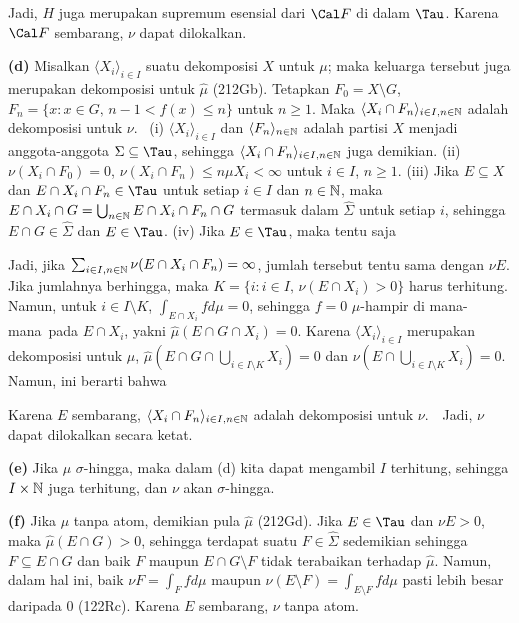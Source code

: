 {\noindent Jadi, $H$ juga merupakan supremum esensial dari $\Cal F$
di dalam $\Tau$. Karena $\Cal F$ sembarang, $\nu$ dapat dilokalkan.

\medskip

{\bf (d)} Misalkan $\langle X_i\rangle_{i\in I}$ suatu dekomposisi
$X$ untuk $\mu$; maka keluarga tersebut juga merupakan dekomposisi untuk
$\hat\mu$ (212Gb). Tetapkan $F_0=X\setminus G$,
$F_n=\{x:x\in G,\,n-1<f(x)\le n\}$ untuk $n\ge 1$. Maka
$\langle X_i\cap F_n\rangle_{i\in I,n\in\Bbb N}$ adalah dekomposisi
untuk $\nu$. \Prf\ (i) $\langle X_i\rangle_{i\in I}$ dan
$\langle F_n\rangle_{n\in\Bbb N}$ adalah partisi $X$ menjadi
anggota-anggota $\Sigma\subseteq\Tau$, sehingga
$\langle X_i\cap F_n\rangle_{i\in I,n\in\Bbb N}$ juga demikian.
(ii) $\nu(X_i\cap F_0)=0$,
$\nu(X_i\cap F_n)\le n\mu X_i<\infty$ untuk $i\in I$, $n\ge 1$.
(iii) Jika $E\subseteq X$ dan $E\cap X_i\cap F_n\in\Tau$ untuk setiap
$i\in I$ dan $n\in\Bbb N$, maka
$E\cap X_i\cap G=\bigcup_{n\in\Bbb N}E\cap X_i\cap F_n\cap G$ termasuk
dalam $\hat\Sigma$ untuk setiap $i$, sehingga
$E\cap G\in\hat\Sigma$ dan $E\in\Tau$.
(iv) Jika $E\in\Tau$, maka tentu saja


\noindent Jadi, jika
$\sum_{i\in I,n\in\Bbb N}\nu(E\cap X_i\cap F_n)=\infty$, jumlah tersebut
tentu sama dengan $\nu E$. Jika jumlahnya berhingga, maka
$K=\{i:i\in I,\,\nu(E\cap X_i)>0\}$ harus terhitung. Namun, untuk
$i\in I\setminus K$, $\int_{E\cap X_i}fd\mu=0$, sehingga
$f=0\,\,\mu$-hampir di mana-mana\ pada $E\cap X_i$, yakni
$\hat\mu(E\cap G\cap X_i)=0$. Karena
$\langle X_i\rangle_{i\in I}$ merupakan dekomposisi untuk $\hat\mu$,
$\hat\mu(E\cap G\cap\bigcup_{i\in I\setminus K}X_i)=0$ dan
$\nu(E\cap\bigcup_{i\in I\setminus K}X_i)=0$. Namun, ini berarti bahwa


\noindent Karena $E$ sembarang,
$\langle X_i\cap F_n\rangle_{i\in I,n\in\Bbb N}$ adalah dekomposisi
untuk $\nu$.\ \QeD\ Jadi, $\nu$ dapat dilokalkan secara ketat.

\medskip

{\bf (e)} Jika $\mu$ $\sigma$-hingga, maka dalam (d) kita dapat mengambil
$I$ terhitung, sehingga $I\times\Bbb N$ juga terhitung, dan $\nu$ akan
$\sigma$-hingga.

\medskip

{\bf (f)} Jika $\mu$ tanpa atom, demikian pula $\hat\mu$ (212Gd).
Jika $E\in\Tau$ dan $\nu E>0$, maka $\hat\mu(E\cap G)>0$, sehingga
terdapat suatu $F\in\hat\Sigma$ sedemikian sehingga
$F\subseteq E\cap G$ dan baik $F$ maupun $E\cap G\setminus F$ tidak
terabaikan terhadap $\hat\mu$. Namun, dalam hal ini, baik
$\nu F=\int_Ffd\mu$ maupun
$\nu(E\setminus F)=\int_{E\setminus F}fd\mu$ pasti lebih besar daripada
$0$ (122Rc). Karena $E$ sembarang, $\nu$ tanpa atom.
}%

